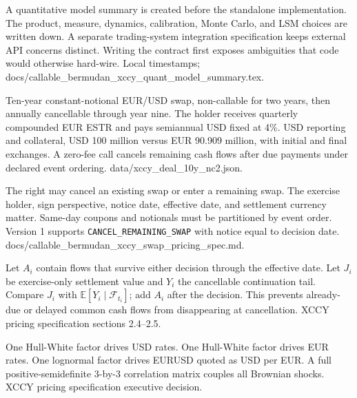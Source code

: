
{A quantitative model summary is created before the standalone implementation.}
{The product, measure, dynamics, calibration, Monte Carlo, and LSM choices are written down.}
{A separate trading-system integration specification keeps external API concerns distinct.}
{Writing the contract first exposes ambiguities that code would otherwise hard-wire.}
{Local timestamps; docs/callable\_bermudan\_xccy\_quant\_model\_summary.tex.}

{Ten-year constant-notional EUR/USD swap, non-callable for two years, then annually cancellable through year nine.}
{The holder receives quarterly compounded EUR ESTR and pays semiannual USD fixed at 4\%.}
{USD reporting and collateral, USD 100 million versus EUR 90.909 million, with initial and final exchanges.}
{A zero-fee call cancels remaining cash flows after due payments under declared event ordering.}
{data/xccy\_deal\_10y\_nc2.json.}

{The right may cancel an existing swap or enter a remaining swap.}
{The exercise holder, sign perspective, notice date, effective date, and settlement currency matter.}
{Same-day coupons and notionals must be partitioned by event order.}
{Version 1 supports \texttt{CANCEL\_REMAINING\_SWAP} with notice equal to decision date.}
{docs/callable\_bermudan\_xccy\_swap\_pricing\_spec.md.}

{Let $A_i$ contain flows that survive either decision through the effective date.}
{Let $J_i$ be exercise-only settlement value and $Y_i$ the cancellable continuation tail.}
{Compare $J_i$ with $\mathbb E[Y_i\mid\mathcal F_{t_i}]$; add $A_i$ after the decision.}
{This prevents already-due or delayed common cash flows from disappearing at cancellation.}
{XCCY pricing specification sections 2.4--2.5.}

{One Hull-White factor drives USD rates.}
{One Hull-White factor drives EUR rates.}
{One lognormal factor drives EURUSD quoted as USD per EUR.}
{A full positive-semidefinite 3-by-3 correlation matrix couples all Brownian shocks.}
{XCCY pricing specification executive decision.}

